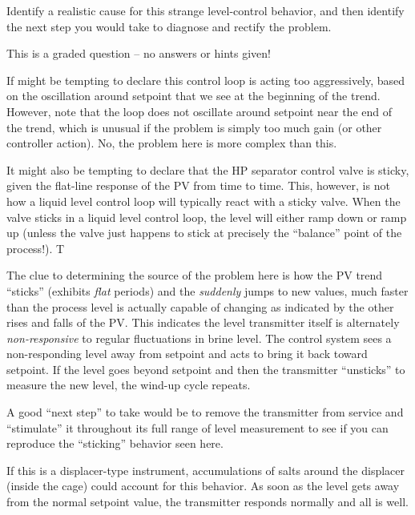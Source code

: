 Identify a realistic cause for this strange level-control behavior, and then identify the next step you would take to diagnose and rectify the problem.

\vfil

\eject






This is a graded question -- no answers or hints given!







If might be tempting to declare this control loop is acting too aggressively, based on the oscillation around setpoint that we see at the beginning of the trend.  However, note that the loop does not oscillate around setpoint near the end of the trend, which is unusual if the problem is simply too much gain (or other controller action).  No, the problem here is more complex than this.

\vskip 10pt

It might also be tempting to declare that the HP separator control valve is sticky, given the flat-line response of the PV from time to time.  This, however, is not how a liquid level control loop will typically react with a sticky valve.  When the valve sticks in a liquid level control loop, the level will either ramp down or ramp up (unless the valve just happens to stick at precisely the ``balance'' point of the process!).  T

\vskip 10pt

The clue to determining the source of the problem here is how the PV trend ``sticks'' (exhibits {\it flat} periods) and the {\it suddenly} jumps to new values, much faster than the process level is actually capable of changing as indicated by the other rises and falls of the PV.  This indicates the level transmitter itself is alternately {\it non-responsive} to regular fluctuations in brine level.  The control system sees a non-responding level away from setpoint and acts to bring it back toward setpoint.  If the level goes beyond setpoint and then the transmitter ``unsticks'' to measure the new level, the wind-up cycle repeats.

\vskip 10pt

A good ``next step'' to take would be to remove the transmitter from service and ``stimulate'' it throughout its full range of level measurement to see if you can reproduce the ``sticking'' behavior seen here.

\vskip 10pt

If this is a displacer-type instrument, accumulations of salts around the displacer (inside the cage) could account for this behavior.  As soon as the level gets away from the normal setpoint value, the transmitter responds normally and all is well.




